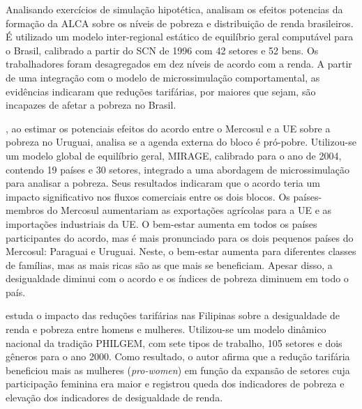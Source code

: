 Analisando exercícios de simulação hipotética, \textcite{ferreira06} analisam os efeitos potencias da formação da ALCA sobre os níveis de pobreza e distribuição de renda brasileiros. É utilizado um modelo inter-regional estático de equilíbrio geral computável para o Brasil, calibrado a partir do SCN de 1996 com 42 setores e 52 bens. Os trabalhadores foram desagregados em dez níveis de acordo com a renda. A partir de uma integração com o modelo de microssimulação comportamental, as evidências indicaram que reduções tarifárias, por maiores que sejam, são incapazes de afetar a pobreza no Brasil.

\textcite{estrades12}, ao estimar os potenciais efeitos do acordo entre o Mercosul e a UE sobre a pobreza no Uruguai, analisa se a agenda externa do bloco é pró-pobre. Utilizou-se um modelo global de equilíbrio geral, MIRAGE, calibrado para o ano de 2004, contendo 19 países e 30 setores, integrado a uma abordagem de microssimulação para analisar a pobreza. Seus resultados indicaram que o acordo teria um impacto significativo nos fluxos comerciais entre os dois blocos. Os países-membros do Mercosul aumentariam as exportações agrícolas para a UE e as importações industriais da UE. O bem-estar aumenta em todos os países participantes do acordo, mas é mais pronunciado para os dois pequenos países do Mercosul: Paraguai e Uruguai. Neste, o bem-estar aumenta para diferentes classes de famílias, mas as mais ricas são as que mais se beneficiam. Apesar disso, a desigualdade diminui com o acordo e os índices de pobreza diminuem em todo o país.

\textcite{corong14} estuda o impacto das reduções tarifárias nas Filipinas sobre a desigualdade de renda e pobreza entre homens e mulheres. Utilizou-se um modelo dinâmico nacional da tradição PHILGEM, com sete tipos de trabalho, 105 setores e dois gêneros para o ano 2000. Como resultado, o autor afirma que a redução tarifária beneficiou mais as mulheres (\textit{pro-women}) em função da expansão de setores cuja participação feminina era maior e registrou queda dos indicadores de pobreza e elevação dos indicadores de desigualdade de renda. 


